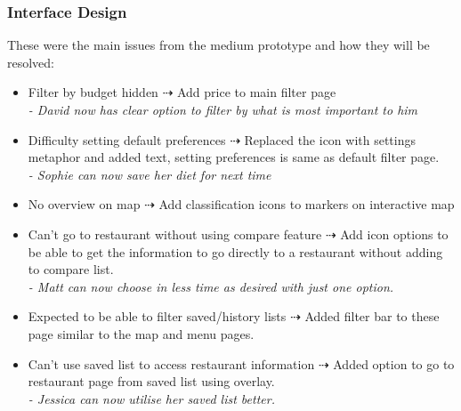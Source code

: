 \documentclass[a4 paper, 12pt]{article}
\begin{document}
    \subsubsection{Interface Design}
    These were the main issues from the medium prototype and how they will be resolved:
    \begin{itemize}
        \item Filter by budget hidden $\dashrightarrow$ Add price to main filter page \\
        \textit{- David now has clear option to filter by what is most important to him}
        \item Difficulty setting default preferences $\dashrightarrow$ Replaced the icon with settings metaphor and added text, setting preferences is same as default filter page. \\
        \textit{- Sophie can now save her diet for next time}
        \item No overview on map  $\dashrightarrow$ Add classification icons to markers on interactive map            
        \item Can't go to restaurant without using compare feature $\dashrightarrow$ Add icon options to be able to get the information to go directly to a restaurant without adding to compare list. \\
        \textit{- Matt can now choose in less time as desired with just one option.}
        \item Expected to be able to filter saved/history lists $\dashrightarrow$ Added filter bar to these page similar to the map and menu pages. 
        \item Can't use saved list to access restaurant information $\dashrightarrow$ Added option to go to restaurant page from saved list using overlay.  \\
        \textit{- Jessica can now utilise her saved list better.}
    \end{itemize}
\end{document}
